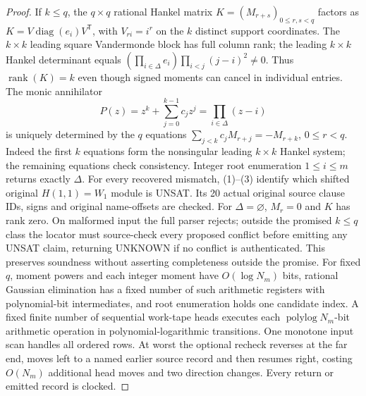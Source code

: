 \documentclass[11pt]{article}
\begin{document}
\begin{proof}
If $k\le q$, the $q\times q$ rational Hankel matrix $K=(M_{r+s})_{0\le r,s<q}$ factors as $K=V\operatorname{diag}(e_i) V^{\mathsf T}$, with $V_{ri}=i^r$ on the $k$ distinct support coordinates. The $k\times k$ leading square Vandermonde block has full column rank; the leading $k\times k$ Hankel determinant equals $(\prod_{i\in\Delta}e_i)\prod_{i<j}(j-i)^2\ne0$. Thus $\operatorname{rank}(K)=k$ even though signed moments can cancel in individual entries. The monic annihilator
\[
 P(z)=z^k+\sum_{j=0}^{k-1}c_jz^j=\prod_{i\in\Delta}(z-i)
\]
is uniquely determined by the $q$ equations $\sum_{j<k}c_jM_{r+j}=-M_{r+k}$, $0\le r<q$. Indeed the first $k$ equations form the nonsingular leading $k\times k$ Hankel system; the remaining equations check consistency. Integer root enumeration $1\le i\le m$ returns exactly $\Delta$. For every recovered mismatch, (1)--(3) identify which shifted original $H(1,1)=W_1$ module is UNSAT. Its 20 actual original source clause IDs, signs and original name-offsets are checked. For $\Delta=\varnothing$, $M_r=0$ and $K$ has rank zero. On malformed input the full parser rejects; outside the promised $k\le q$ class the locator must source-check every proposed conflict before emitting any UNSAT claim, returning \textsf{UNKNOWN} if no conflict is authenticated. This preserves soundness without asserting completeness outside the promise.
For fixed $q$, moment powers and each integer moment have $O(\log N_m)$ bits, rational Gaussian elimination has a fixed number of such arithmetic registers with polynomial-bit intermediates, and root enumeration holds one candidate index. A fixed finite number of sequential work-tape heads executes each $\operatorname{polylog}N_m$-bit arithmetic operation in polynomial-logarithmic transitions. One monotone input scan handles all ordered rows. At worst the optional recheck reverses at the far end, moves left to a named earlier source record and then resumes right, costing $O(N_m)$ additional head moves and two direction changes. Every return or emitted record is clocked.
\end{proof}
\end{document}
